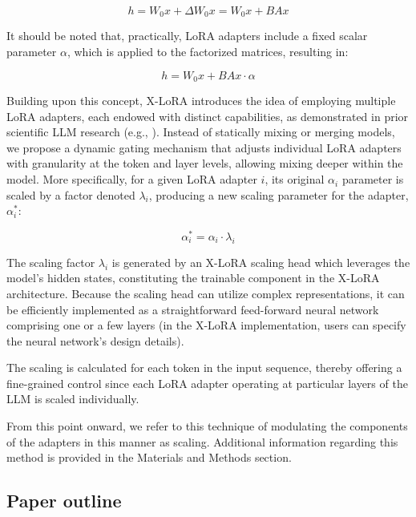 \begin{equation}
    h = W_0x + \Delta W_0x = W_0x + BAx
\end{equation}

It should be noted that, practically, LoRA adapters include a fixed scalar parameter $\alpha$, which is applied to the factorized matrices, resulting in:

\begin{equation}
    h = W_0x + BAx \cdot \alpha
\end{equation}

Building upon this concept, X-LoRA introduces the idea of employing multiple LoRA adapters, each endowed with distinct capabilities, as demonstrated in prior scientific LLM research (e.g., \cite{Buehler2023GenerativeDesign}). Instead of statically mixing or merging models, we propose a dynamic gating mechanism that adjusts individual LoRA adapters with granularity at the token and layer levels, allowing mixing deeper within the model. More specifically, for a given LoRA adapter $i$, its original $\alpha_i$ parameter is scaled by a factor denoted $\lambda_i$, producing a new scaling parameter for the adapter, $\alpha^*_i$:

\begin{equation}
    \alpha^*_i = \alpha_i \cdot \lambda_i
\end{equation}

The scaling factor $\lambda_i$ is generated by an X-LoRA scaling head which leverages the model’s hidden states, constituting the trainable component in the X-LoRA architecture. Because the scaling head can utilize complex representations, it can be efficiently implemented as a straightforward feed-forward neural network comprising one or a few layers (in the X-LoRA implementation, users can specify the neural network's design details).

The scaling is calculated for each token in the input sequence, thereby offering a fine-grained control since each LoRA adapter operating at particular layers of the LLM is scaled individually.

From this point onward, we refer to this technique of modulating the components of the adapters in this manner as scaling. Additional information regarding this method is provided in the Materials and Methods section.

\subsection{Paper outline}

